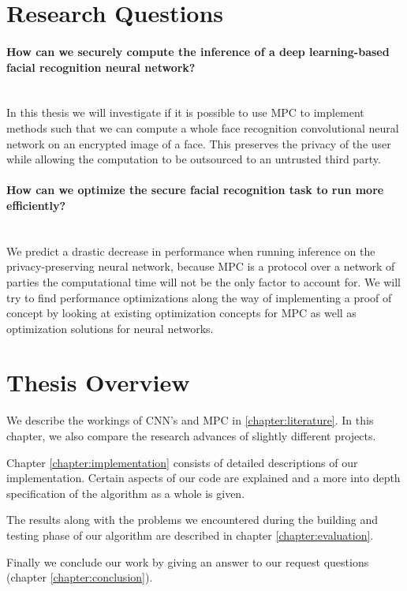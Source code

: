 \section{Research Questions}
\label{chapter:hypothesis}
\paragraph{How can we securely compute the inference of a deep learning-based facial recognition neural network?}\mbox{} \\
In  this thesis we will investigate if it is possible to use MPC to implement methods such that we can compute a whole face recognition convolutional neural network on an encrypted image of a face. This preserves the privacy of the user while allowing the computation to be outsourced to an untrusted third party.
\paragraph{How can we optimize the secure facial recognition task to run more efficiently?}\mbox{}
\\
We predict a drastic decrease in performance when running inference on the privacy-preserving neural network, because MPC is a protocol over a network of parties the computational time will not be the only factor to account for. We will try to find performance optimizations along the way of implementing a proof of concept by looking at existing optimization concepts for MPC as well as optimization solutions for neural networks.


\section{Thesis Overview}

We describe the workings of CNN's and MPC in \ref{chapter:literature}. In this chapter, we also compare the research advances of slightly different projects.

Chapter \ref{chapter:implementation} consists of detailed descriptions of our implementation. Certain aspects of our code are explained and a more into depth specification of the algorithm as a whole is given.

The results along with the problems we encountered during the building and testing phase of our algorithm are described in chapter \ref{chapter:evaluation}.

Finally we conclude our work by giving an answer to our request questions (chapter \ref{chapter:conclusion}).
